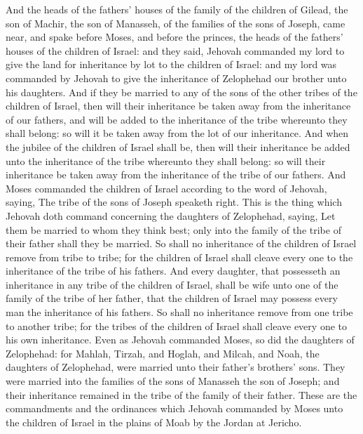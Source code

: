 And the heads of the fathers’ houses of the family of the children of Gilead, the son of Machir, the son of Manasseh, of the families of the sons of Joseph, came near, and spake before Moses, and before the princes, the heads of the fathers’ houses of the children of Israel: and they said, Jehovah commanded my lord to give the land for inheritance by lot to the children of Israel: and my lord was commanded by Jehovah to give the inheritance of Zelophehad our brother unto his daughters. And if they be married to any of the sons of the other tribes of the children of Israel, then will their inheritance be taken away from the inheritance of our fathers, and will be added to the inheritance of the tribe whereunto they shall belong: so will it be taken away from the lot of our inheritance. And when the jubilee of the children of Israel shall be, then will their inheritance be added unto the inheritance of the tribe whereunto they shall belong: so will their inheritance be taken away from the inheritance of the tribe of our fathers.  And Moses commanded the children of Israel according to the word of Jehovah, saying, The tribe of the sons of Joseph speaketh right. This is the thing which Jehovah doth command concerning the daughters of Zelophehad, saying, Let them be married to whom they think best; only into the family of the tribe of their father shall they be married. So shall no inheritance of the children of Israel remove from tribe to tribe; for the children of Israel shall cleave every one to the inheritance of the tribe of his fathers. And every daughter, that possesseth an inheritance in any tribe of the children of Israel, shall be wife unto one of the family of the tribe of her father, that the children of Israel may possess every man the inheritance of his fathers. So shall no inheritance remove from one tribe to another tribe; for the tribes of the children of Israel shall cleave every one to his own inheritance.  Even as Jehovah commanded Moses, so did the daughters of Zelophehad: for Mahlah, Tirzah, and Hoglah, and Milcah, and Noah, the daughters of Zelophehad, were married unto their father’s brothers’ sons. They were married into the families of the sons of Manasseh the son of Joseph; and their inheritance remained in the tribe of the family of their father.  These are the commandments and the ordinances which Jehovah commanded by Moses unto the children of Israel in the plains of Moab by the Jordan at Jericho. 